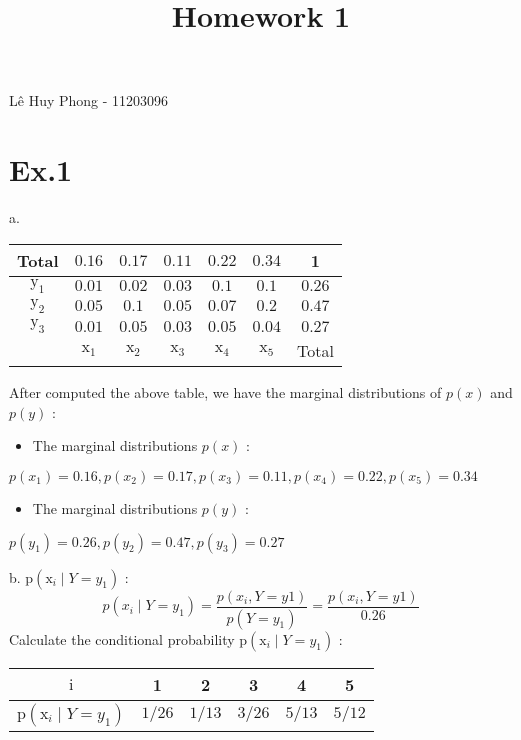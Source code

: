 \documentclass[10pt]{article}
\title{Homework 1 }
\author{}
\date{}
\begin{document}
\maketitle
Lê Huy Phong - 11203096


\section{Ex.1}
a.

\begin{tabular}{|c|c|c|c|c|c|c|}
\hline
Total & $0.16$ & $0.17$ & $0.11$ & $0.22$ & $0.34$ & 1 \\
\hline
$\mathrm{y}_{1}$ & $0.01$ & $0.02$ & $0.03$ & $0.1$ & $0.1$ & $0.26$ \\
\hline
$\mathrm{y}_{2}$ & $0.05$ & $0.1$ & $0.05$ & $0.07$ & $0.2$ & $0.47$ \\
\hline
$\mathrm{y}_{3}$ & $0.01$ & $0.05$ & $0.03$ & $0.05$ & $0.04$ & $0.27$ \\
\hline
 & $\mathrm{x}_{1}$ & $\mathrm{x}_{2}$ & $\mathrm{x}_{3}$ & $\mathrm{x}_{4}$ & $\mathrm{x}_{5}$ & Total \\
\hline
\end{tabular}

After computed the above table, we have the marginal distributions of $p(x)$ and $p(y)$ :

\begin{itemize}
  \item The marginal distributions $p(x)$ :
\end{itemize}
$p\left(x_{1}\right)=0.16, p\left(x_{2}\right)=0.17, p\left(x_{3}\right)=0.11, p\left(x_{4}\right)=0.22, p\left(x_{5}\right)=0.34$

\begin{itemize}
  \item The marginal distributions $p(y)$ :
\end{itemize}
$p\left(y_{1}\right)=0.26, p\left(y_{2}\right)=0.47, p\left(y_{3}\right)=0.27$

b. $\mathrm{p}\left(\mathrm{x}_{i} \mid Y=y_{1}\right)$ :
$$
p\left(x_{i} \mid Y=y_{1}\right)=\frac{p\left(x_{i}, Y=y 1\right)}{p\left(Y=y_{1}\right)}=\frac{p\left(x_{i}, Y=y 1\right)}{0.26}
$$
Calculate the conditional probability $\mathrm{p}\left(\mathrm{x}_{i} \mid Y=y_{1}\right)$ :

\begin{tabular}{|c|c|c|c|c|c|}
\hline
$\mathrm{i}$ & 1 & 2 & 3 & 4 & 5 \\
\hline
$\mathrm{p}\left(\mathrm{x}_{i} \mid Y=y_{1}\right)$ & $1 / 26$ & $1 / 13$ & $3 / 26$ & $5 / 13$ & $5 / 12$ \\
\hline
\end{tabular}
\end{document}
